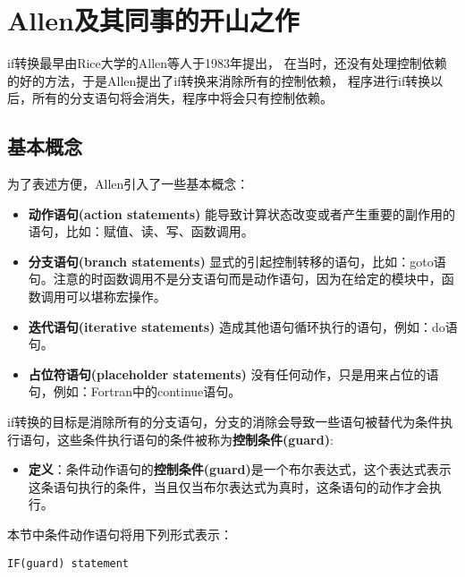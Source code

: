 \section{Allen及其同事的开山之作}

if转换最早由Rice大学的Allen等人于1983年提出\cite{allen1983Concondeptodatdep}，
在当时，还没有处理控制依赖的好的方法，于是Allen提出了if转换来消除所有的控制依赖，
程序进行if转换以后，所有的分支语句将会消失，程序中将会只有控制依赖。

\subsection{基本概念}

为了表述方便，Allen引入了一些基本概念：
\begin{itemize}
\item \textbf{动作语句(action statements)}
能导致计算状态改变或者产生重要的副作用的语句，比如：赋值、读、写、函数调用。
\item \textbf{分支语句(branch statements)}
显式的引起控制转移的语句，比如：goto语句。注意的时函数调用不是分支语句而是动作语句，因为在给定的模块中，函数调用可以堪称宏操作。
\item \textbf{迭代语句(iterative statements)}
造成其他语句循环执行的语句，例如：do语句。
\item \textbf{占位符语句(placeholder statements)}
没有任何动作，只是用来占位的语句，例如：Fortran中的continue语句。
\end{itemize}

if转换的目标是消除所有的分支语句，分支的消除会导致一些语句被替代为条件执行语句，这些条件执行语句的条件被称为\textbf{控制条件(guard)}:

\begin{itemize}
\item \textbf{定义}：条件动作语句的\textbf{控制条件(guard)}是一个布尔表达式，这个表达式表示这条语句执行的条件，当且仅当布尔表达式为真时，这条语句的动作才会执行。
\end{itemize}

本节中条件动作语句将用下列形式表示：
\begin{lstlisting}[language=FORTRAN]
IF(guard) statement
\end{lstlisting}

